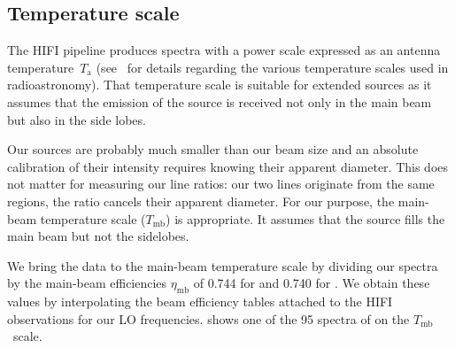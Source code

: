 
\subsection{Temperature scale}
The HIFI pipeline produces spectra with a power scale expressed as an antenna temperature~$T_\text{a}$
(see~\textcite{kutner1981recommendations} for details regarding the various temperature scales used in radioastronomy).
That temperature scale is suitable for extended sources as it assumes that the emission of the source is received not only in the main beam but also in the side lobes.


Our sources are probably much smaller than our beam size and an absolute calibration of their intensity requires knowing their apparent diameter.
This does not matter for measuring our line ratios:
our two lines originate from the same regions, the ratio cancels their apparent diameter.
For our purpose, the main-beam temperature scale ($T_\text{mb}$) is appropriate.
It assumes that the source fills the main beam but not the sidelobes.

We bring the data to the main-beam temperature scale by dividing our spectra by the main-beam efficiencies $\eta_\text{mb}$ of
\num{0.744} for  and \num{0.740} for .
We obtain these values by interpolating the beam efficiency tables attached to the HIFI observations for our LO frequencies.
 shows one of the 95 spectra of  on the $T_\text{mb}$~scale.



